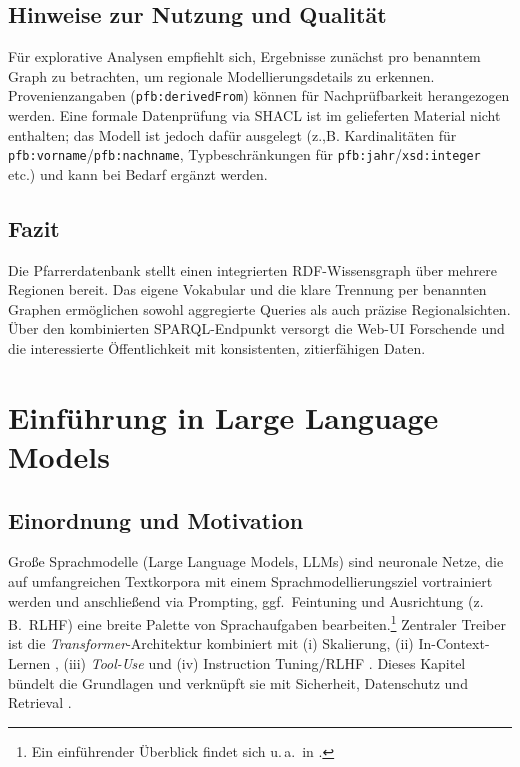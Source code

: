 \subsection{Hinweise zur Nutzung und Qualität}
Für explorative Analysen empfiehlt sich, Ergebnisse zunächst pro benanntem Graph zu betrachten, um regionale Modellierungsdetails zu erkennen. Provenienzangaben (\texttt{pfb:derivedFrom}) können für Nachprüfbarkeit herangezogen werden. Eine formale Datenprüfung via SHACL ist im gelieferten Material nicht enthalten; das Modell ist jedoch dafür ausgelegt (z.,B. Kardinalitäten für \texttt{pfb:vorname}/\texttt{pfb:nachname}, Typbeschränkungen für \texttt{pfb:jahr}/\texttt{xsd:integer} etc.) und kann bei Bedarf ergänzt werden.

\subsection{Fazit}
Die Pfarrerdatenbank stellt einen integrierten RDF-Wissensgraph über mehrere Regionen bereit. Das eigene Vokabular und die klare Trennung per benannten Graphen ermöglichen sowohl aggregierte Queries als auch präzise Regionalsichten. Über den kombinierten SPARQL-Endpunkt versorgt die Web-UI Forschende und die interessierte Öffentlichkeit mit konsistenten, zitierfähigen Daten.








\section{Einführung in Large Language Models}
\label{sec:llm}

\subsection{Einordnung und Motivation}
Große Sprachmodelle (Large Language Models, LLMs) sind neuronale Netze, die auf umfangreichen Textkorpora mit einem Sprachmodellierungsziel vortrainiert werden und anschließend via Prompting, ggf.\ Feintuning und Ausrichtung (z.\,B.\ RLHF) eine breite Palette von Sprachaufgaben bearbeiten.\footnote{Ein einführender Überblick findet sich u.\,a.\ in \cite{campesatoLLMIntro}.} 
Zentraler Treiber ist die \emph{Transformer}-Architektur \cite{vaswani2017attention} kombiniert mit (i) Skalierung, (ii) In-Context-Lernen \cite{brown2020language,wei2022chain}, (iii) \emph{Tool-Use} \cite{yao2023react} und (iv) Instruction Tuning/RLHF \cite{ouyang2022training}. Dieses Kapitel bündelt die Grundlagen und verknüpft sie mit Sicherheit, Datenschutz und Retrieval \cite{abadi2016deep,carlini2021extracting,lewis2020rag}.

